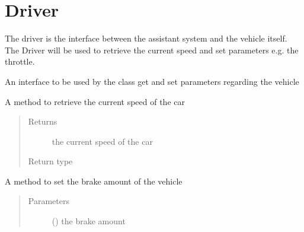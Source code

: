 \documentclass[letterpaper,10pt,english]{sphinxmanual}
\begin{document}
\ignorespaces 

\chapter{Driver}
\label{\detokenize{driver:driver}}\label{\detokenize{driver:index-0}}\label{\detokenize{driver::doc}}
The driver is the interface between the assistant system and the vehicle itself. The Driver will be used to retrieve the
current speed and set parameters e.g. the throttle.

\begin{fulllineitems}
\label{\detokenize{driver:lib.driver.Driver}}
An interface to be used by the {\hyperref[\detokenize{no_collide:lib.nocollide.NoCollide}]{}} class get and set parameters regarding
the vehicle

\begin{fulllineitems}
\label{\detokenize{driver:lib.driver.Driver.get_speed}}
A method to retrieve the current speed of the car
\begin{quote}\begin{description}
\item[{Returns}] \leavevmode
the current speed of the car

\item[{Return type}] \leavevmode
{\hyperref[\detokenize{data:lib.data.Speed}]{}}

\end{description}\end{quote}

\end{fulllineitems}


\begin{fulllineitems}
\label{\detokenize{driver:lib.driver.Driver.set_brake}}
A method to set the brake amount of the vehicle
\begin{quote}\begin{description}
\item[{Parameters}] \leavevmode
{} () \textendash{} the brake amount


\end{description}
\end{quote}
\end{fulllineitems}
\end{fulllineitems}
\end{document}
